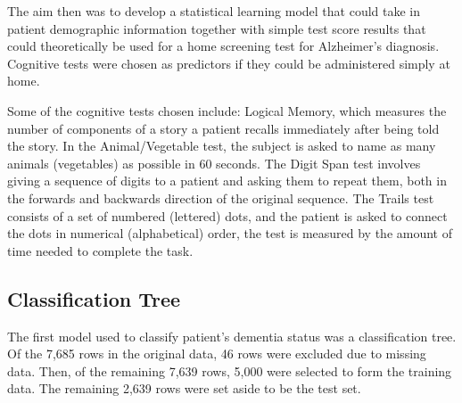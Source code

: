 \documentclass[a4paper,man,natbib,11pt]{article}
\begin{document}
The aim then was to develop a statistical learning model that could take in patient demographic information together with simple test score results that could theoretically be used for a home screening test for Alzheimer's diagnosis. Cognitive tests were chosen as predictors if they could be administered simply at home. 

Some of the cognitive tests chosen include: Logical Memory, which measures the number of components of a story a patient recalls immediately after being told the story. In the Animal/Vegetable test, the subject is asked to name as many animals (vegetables) as possible in 60 seconds. The Digit Span test involves giving a sequence of digits to a patient and asking them to repeat them, both in the forwards and backwards direction of the original sequence. The Trails test consists of a set of numbered (lettered) dots, and the patient is asked to connect the dots in numerical (alphabetical) order, the test is measured by the amount of time needed to complete the task.

\subsection{Classification Tree}

The first model used to classify patient's dementia status was a classification tree. Of the 7,685 rows in the original data, 46 rows were excluded due to missing data. Then, of the remaining 7,639 rows, 5,000 were selected to form the training data. The remaining 2,639 rows were set aside to be the test set.
\end{document}
